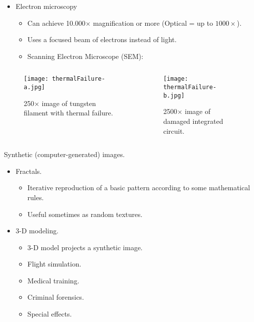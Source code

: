 \begin{frame}
\begin{itemize}
\item Electron microscopy
\begin{itemize}
\item Can achieve 10.000$\times$ magnification or more (Optical = up to $1000\times$).
\item Uses a focused beam of electrons instead of light.
\item Scanning Electron Microscope (SEM):
\end{itemize}
\end{itemize}
\begin{columns}
\begin{column}{.48\textwidth}
\begin{figure}
\texttt{[image: thermalFailure-a.jpg]}
\caption{250$\times$ image of tungsten filament with thermal failure.}
\end{figure}
\end{column}
\begin{column}{.48\textwidth}
\begin{figure}
\texttt{[image: thermalFailure-b.jpg]}
\caption{2500$\times$ image of damaged integrated circuit.}
\end{figure}
\end{column}
\end{columns}
\end{frame}


\begin{frame}
Synthetic (computer-generated) images.
\begin{itemize}
\item Fractals.
\begin{itemize}
\item Iterative reproduction of a basic pattern according to some mathematical rules.
\item Useful sometimes as random textures.
\end{itemize}
\item 3-D modeling.
\begin{itemize}
\item 3-D model projects a synthetic image.
\item Flight simulation.
\item Medical training.
\item Criminal forensics.
\item Special effects.
\end{itemize}
\end{itemize}
\end{frame}

